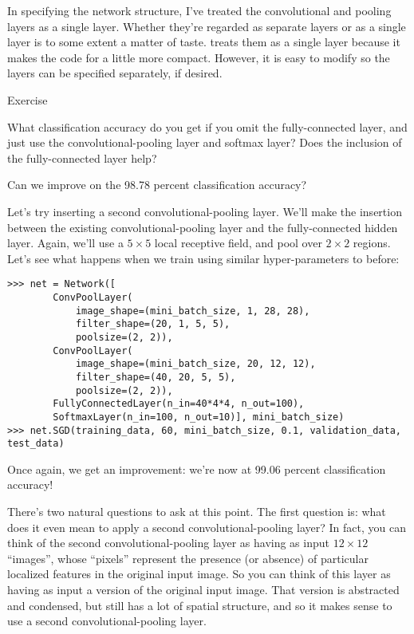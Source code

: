 \documentclass[a4paper,twoside,10pt]{book}
\begin{document}
In specifying the network structure, I've treated the convolutional and pooling layers as a single layer. Whether they're regarded as separate layers or as a single layer is to some extent a matter of taste.  treats them as a single layer because it makes the code for  a little more compact. However, it is easy to modify  so the layers can be specified separately, if desired.

\begin{exercize}{Exercise}
	\item What classification accuracy do you get if you omit the fully-connected layer, and just use the convolutional-pooling layer and softmax layer? Does the inclusion of the fully-connected layer help?
\end{exercize}
Can we improve on the 98.78 percent classification accuracy?


Let's try inserting a second convolutional-pooling layer. We'll make the insertion between the existing convolutional-pooling layer and the fully-connected hidden layer. Again, we'll use a $5\times5$ local receptive field, and pool over $2\times2$ regions. Let's see what happens when we train using similar hyper-parameters to before:

\begin{lstlisting}
>>> net = Network([
		ConvPoolLayer(
			image_shape=(mini_batch_size, 1, 28, 28), 
			filter_shape=(20, 1, 5, 5), 
			poolsize=(2, 2)),
		ConvPoolLayer(
			image_shape=(mini_batch_size, 20, 12, 12), 
			filter_shape=(40, 20, 5, 5), 
			poolsize=(2, 2)), 
		FullyConnectedLayer(n_in=40*4*4, n_out=100),
		SoftmaxLayer(n_in=100, n_out=10)], mini_batch_size)
>>> net.SGD(training_data, 60, mini_batch_size, 0.1, validation_data, test_data)        
\end{lstlisting}
Once again, we get an improvement: we're now at 99.06 percent classification accuracy!

There's two natural questions to ask at this point. The first question is: what does it even mean to apply a second convolutional-pooling layer? In fact, you can think of the second convolutional-pooling layer as having as input $12\times12$ ``images'', whose ``pixels'' represent the presence (or absence) of particular localized features in the original input image. So you can think of this layer as having as input a version of the original input image. That version is abstracted and condensed, but still has a lot of spatial structure, and so it makes sense to use a second convolutional-pooling layer.
\end{document}
